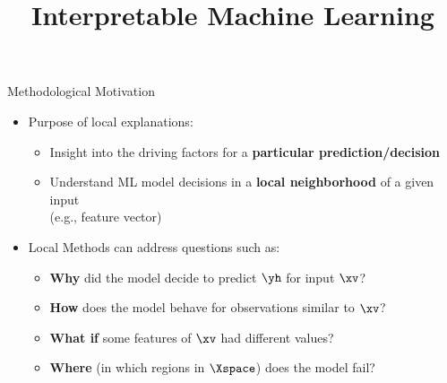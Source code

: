 \documentclass[11pt,compress,t,notes=noshow, aspectratio=169, xcolor=table]{beamer}
\title{Interpretable Machine Learning}
\date{}
\begin{document}



 \newcommand{\titlefigure}{figure/lime.png}
\newcommand{\learninggoals}{
\item Understand motivation for local explanations 
\item Develop an intuition for possible use-cases
\item Know characteristics of local explanation methods}



\begin{frame}[t]{Methodological Motivation}


	\begin{itemize}
	    \item Purpose of local explanations:
	    \begin{itemize}
	        \item Insight into the driving factors for a \textbf{particular prediction/decision}
	        \item Understand ML model decisions in a \textbf{local neighborhood} of a given input\\ (e.g., feature vector)
	    \end{itemize}
	    \medskip
	    \pause
		\item Local Methods can address questions such as: 
		\begin{itemize}
		    \item \textbf{Why} did the model decide to predict $\yh$ for input $\xv$?
		    \item \textbf{How} does the model behave for observations similar to $\xv$?
		    \item \textbf{What if} some features of $\xv$ had different values?
		    \item  \textbf{Where} (in which regions in $\Xspace$) does the model fail?
		\end{itemize}  
	\end{itemize}
\end{frame}
\end{document}
